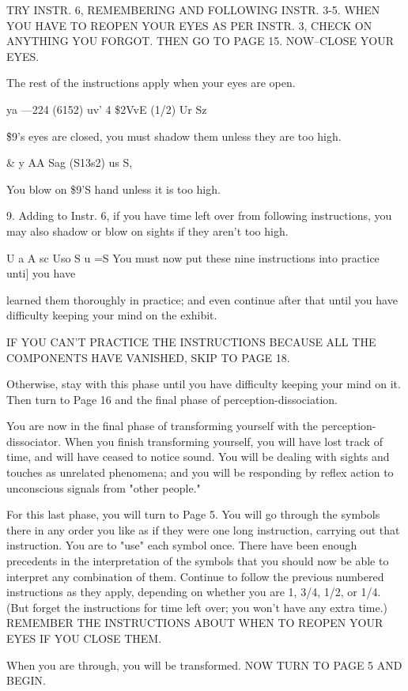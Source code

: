\documentclass[10pt,twoside]{memoir}
\begin{document}
\begin{enumerate}
{\begin{enumerate}
\begin{sysrules}
\begin{sysrules}
\begin{sysrules}
\begin{sysrules}
{\begin{enumerate}
\begin{sysrules}
\begin{enumerate}
TRY INSTR. 6, REMEMBERING AND FOLLOWING INSTR. 3-5. 
WHEN YOU HAVE TO REOPEN YOUR EYES AS PER INSTR. 3, CHECK 
ON ANYTHING YOU FORGOT. THEN GO TO PAGE 15. NOW--CLOSE 
YOUR EYES. 


The rest of the instructions apply when your eyes are open. 


ya —224 (6152) uv' 
4 \$2VvE (1/2) Ur Sz 


\f \$9's eyes are closed, you must shadow them unless they are too high. 


& y AA Sag (S13s2) us S, 


You blow on \$9'S hand unless it is too high. 


9. Adding to Instr. 6, if you have time left over from following 
instructions, you may also shadow or blow on sights if they aren't too high. 


U a A sc Uso S 
u =S 
You must now put these nine instructions into practice unti] you have 


learned them thoroughly in practice; and even continue after that until you 
have difficulty keeping your mind on the exhibit. 


IF YOU CAN'T PRACTICE THE INSTRUCTIONS BECAUSE ALL 
THE COMPONENTS HAVE VANISHED, SKIP TO PAGE 18. 


Otherwise, stay with this phase until you have difficulty keeping your 
mind on it. Then turn to Page 16 and the final phase of 
perception-dissociation. 


You are now in the final phase of transforming yourself with the 
perception-dissociator. When you finish transforming yourself, you will have 
lost track of time, and will have ceased to notice sound. You will be dealing 
with sights and touches as unrelated phenomena; and you will be responding 
by reflex action to unconscious signals from "other people." 

For this last phase, you will turn to Page 5. You will go through the 
symbols there in any order you like as if they were one long instruction, 
carrying out that instruction. You are to "use" each symbol once. There 
have been enough precedents in the interpretation of the symbols that you 
should now be able to interpret any combination of them. Continue to 
follow the previous numbered instructions as they apply, depending on 
whether you are 1, 3/4, 1/2, or 1/4. (But forget the instructions for time left 
over; you won't have any extra time.) REMEMBER THE INSTRUCTIONS 
ABOUT WHEN TO REOPEN YOUR EYES IF YOU CLOSE THEM. 


When you are through, you will be transformed. NOW TURN TO 
PAGE 5 AND BEGIN. 



\end{enumerate}
\end{sysrules}
\end{enumerate}}
\end{sysrules}
\end{sysrules}
\end{sysrules}
\end{sysrules}
\end{enumerate}}
\end{enumerate}
\end{document}
